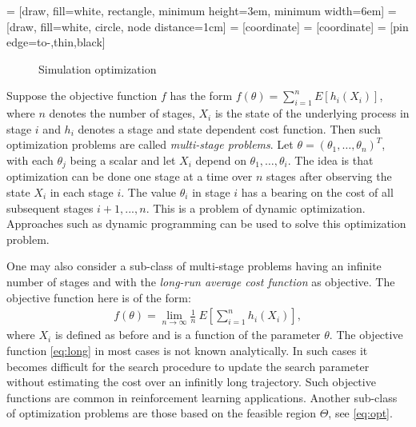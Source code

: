  = [draw, fill=white, rectangle,
   minimum height=3em, minimum width=6em]
 = [draw, fill=white, circle, node distance=1cm]
 = [coordinate]
 = [coordinate]
 = [pin edge={to-,thin,black}]

 \begin{figure}[t]
    \centering
{}
\caption{Simulation optimization}
\label{fig:so}
\end{figure}

Suppose the objective function $f$ has the form $f(\theta) = \sum_{i=1}^{n} E[h_{i}(X_{i})]$, where $n$ denotes the number of stages, $X_{i}$ is the state of the underlying process in stage $i$ and $h_{i}$ denotes a stage and state dependent cost function. Then such optimization problems are called \emph{multi-stage problems}. Let $\theta = (\theta_{1},\ldots,\theta_{n})^{T}$,  with each $\theta_{j}$ being a scalar and let $X_{i}$ depend on $\theta_{1},\ldots,\theta_{i}$. The idea is that optimization can be done one stage at a time over $n$ stages after observing the state $X_{i}$ in each stage $i$. The value $\theta_{i}$ in stage $i$ has a bearing on the cost of all subsequent stages $i+1,...,n$. This is  a problem of dynamic optimization. Approaches such as dynamic programming can be used to solve this optimization problem.\par
One may also consider a sub-class of multi-stage problems having an infinite number of stages and with the \emph{long-run average cost function} as objective. The objective function here is of the form:
\begin{align}\label{eq:long}
 f(\theta) = \lim_{n \to \infty} \frac{1}{n} ~ E \left[ \sum_{i=1}^{n} h_{i}(X_{i})\right ] ,
\end{align}
where $X_{i}$ is defined  as before and is a function of the parameter $\theta$. The objective function \eqref{eq:long} in most cases is not known analytically. In such cases it becomes difficult for the search procedure to update the search parameter without estimating the cost over an infinitly long trajectory. Such  objective functions are  common in reinforcement learning applications. Another sub-class of optimization problems are those based on the feasible region $\Theta$, see \eqref{eq:opt}.

